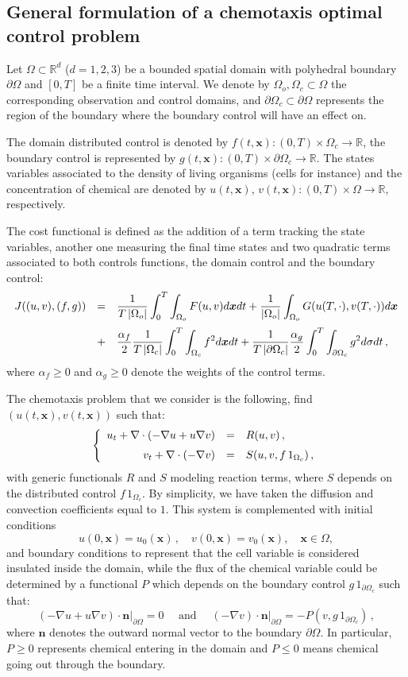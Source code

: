 \documentclass[11pt]{article}
\def \hueco{\noalign{\medskip}}
\def \beq{\begin{equation}}
\def \eeq{\end{equation}}
\def \ba{\begin{array}}
\def \ea{\end{array}}
\def \dis{\displaystyle}
\def \n{\boldsymbol{n}}
\def \x{\boldsymbol{x}}
\numberwithin{theorem}{section}
\begin{document}
\subsection{General formulation of a chemotaxis optimal control problem}

Let $\Omega\subset \mathbb{R}^d$ ($d=1,2,3$) be a bounded spatial domain with polyhedral boundary $\partial\Omega$ and $[0,T]$ be a finite time interval.
We denote by $\Omega_o, \Omega_c \subset \Omega$ the corresponding observation and control domains, and $\partial\Omega_c\subset \partial\Omega$ represents the region of the boundary where the boundary control will have an effect on.

The domain distributed control is denoted by $f(t,\x): (0,T)\times \Omega_c\to \mathbb{R}$, the boundary control is represented by $g(t,\x):(0,T)\times \partial\Omega_c\to \mathbb{R}$.  The states variables associated to the density of living organisms (cells for instance)  and the concentration of chemical are denoted by $u(t,\x)$, $v(t,\x):(0,T)\times\Omega\to \mathbb{R}$, respectively. 

The cost functional is defined as the addition of a term tracking the state variables, another one measuring the final time states and two quadratic terms associated to both controls functions, the domain control and the boundary control:
\beq\label{eq:CostFunctional}
\ba{rcl}
J((u,v),(f,g))
&=&\dis
\frac{1}{T\, |\Omega_o|}\int_0^T\int_{\Omega_o} F(u,v) d\x dt 
+ \frac{1}{ |\Omega_o|}\int_{\Omega_o} G(u(T,\cdot),v(T,\cdot)) d\x
\\ \hueco
&+&\dis
 \frac{\alpha_f}2 \frac{1}{T\, |\Omega_c|} \int_0^T\int_{\Omega_c} f^2 d\x dt 
+ \frac{1}{T\, |\partial \Omega_c|}\frac{\alpha_g}2 \int_0^T\int_{\partial\Omega_c} g^2 d\sigma dt\,,
\ea
\eeq
where $\alpha_f\ge 0$ and $\alpha_g\ge 0$ denote the weights of the control terms.

The chemotaxis problem that we consider is the following, find $(u(t,\x),v(t,\x))$ such that:
\beq
\left\{\ba{rcl}
u_t + \nabla\cdot (-\nabla u + u \nabla v) 
&=&
R(u,v)\,,
\\ \hueco
v_t + \nabla\cdot (-\nabla v) 
&=&
S(u,v,f\, 1_{\Omega_c})\,,
\ea\right.
\eeq
with generic functionals $R$ and $S$ modeling reaction terms, where $S$ depends on the distributed control $f\, 1_{\Omega_c}$. By simplicity, we have taken the diffusion and convection coefficients equal to $1$. This system is complemented with initial conditions
\beq
u(0,\x)=u_0(\x)\,,\quad v(0,\x)=v_0(\x) ,\quad \x\in \Omega,
\eeq
and boundary conditions to represent that the cell variable is considered insulated inside the domain, while the flux of the chemical variable could be determined by a functional $P$ which depends on the boundary control $g\, 1 _{\partial\Omega_c}$ such that:
\beq
(-\nabla u + u \nabla v)\cdot \n \big|_{\partial\Omega}
=0
\quad
\mbox{ and }
\quad
(-\nabla v)\cdot \n \big|_{\partial\Omega}
=
-P(v,g\, 1 _{\partial\Omega_c})\,,
\eeq
where $\n$ denotes the outward normal vector to the boundary $\partial\Omega$. In particular, $P\ge 0$ represents chemical entering in the domain and $P\le 0$ means chemical going out through the boundary. 
\end{document}
